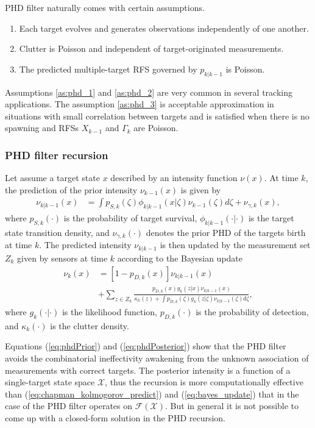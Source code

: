 PHD filter naturally comes with certain assumptions.
\begin{enumerate}
    \item Each target evolves and generates observations independently of one another. \label{as:phd_1}
    \item Clutter is Poisson and independent of target-originated measurements. \label{as:phd_2}
    \item The predicted multiple-target RFS governed by $p_{k|k-1}$ is Poisson. \label{as:phd_3}
\end{enumerate}

Assumptions \ref{as:phd_1} and \ref{as:phd_2} are very common in several tracking applications. The assumption \ref{as:phd_3} is acceptable approximation in situations with small correlation between targets and is satisfied when
there is no spawning and RFSs $X_{k-1}$ and $\Gamma_k$ are Poisson.

            \subsubsection{PHD filter recursion}
Let assume a target state $x$ described by an intensity function $\nu(x)$. At time $k$, the prediction of the prior intensity $\nu_{k-1}(x)$ is given by
\begin{align}
    \nu_{k|k-1}(x) &= \int p_{S,k}(\zeta)\phi_{k|k-1}(x|\zeta)\nu_{k-1}(\zeta)d\zeta + \nu_{\gamma,k}(x), \label{eq:phdPrior}
\end{align}
where $p_{S,k}(\cdot)$ is the probability of target survival, $\phi_{k|k-1}(\cdot|\cdot)$ is the target state transition density, and $\nu_{\gamma,k}(\cdot)$ denotes the prior PHD of the targets birth at time $k$.
The predicted intensity $\nu_{k|k-1}$ is then updated by the measurement set $Z_k$ given by sensors at time $k$ according to the Bayesian update
\begin{align}
        \nu_k(x) &= [1 - p_{D,k}(x)]\nu_{k|k-1}(x) \\
        &+ \sum_{z \in Z_k}\frac{p_{D,k}(x) g_k(z|x) \nu_{k|k-1}(x)}{\kappa_k(z) + \int p_{D,k}(\zeta) g_k(z|\zeta) \nu_{k|k-1}(\zeta)d\zeta}, \label{eq:phdPosterior}
\end{align}
where $g_k(\cdot|\cdot)$ is the likelihood function, $p_{D,k}(\cdot)$ is the probability of detection, and $\kappa_k(\cdot)$ is the clutter density.

Equations (\ref{eq:phdPrior}) and (\ref{eq:phdPosterior}) show that the PHD filter avoids the combinatorial
ineffectivity awakening from the unknown association of measurements with correct targets. The posterior intensity is
a function of a single-target state space $\mathcal{X}$, thus the recursion is more computationally effective than (\ref{eq:chapman_kolmogorov_predict}) and (\ref{eq:bayes_update}) that in the case of the PHD filter operates on $\mathcal{F(X)}$. But in general it is not possible to come up with a closed-form solution in the PHD recursion.

